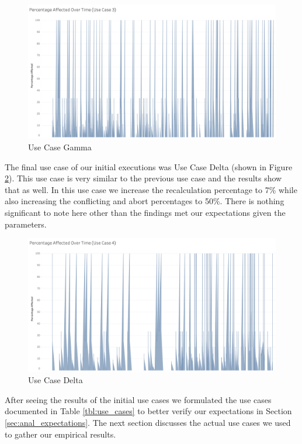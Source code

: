\begin{figure}
\centering
\includegraphics[scale=0.35]{images/UseCase3.png}
\caption{Use Case Gamma}
\label{image:use_case_gamma}
\end{figure}

The final use case of our initial executions was Use Case Delta (shown in Figure \ref{image:use_case_delta}). This use case is very similar to the previous use case and the results show that as well. In this use case we increase the recalculation percentage to 7\% while also increasing the conflicting and abort percentages to 50\%. There is nothing significant to note here other than the findings met our expectations given the parameters.

\begin{figure}
\centering
\includegraphics[scale=0.35]{images/UseCase4.png}
\caption{Use Case Delta}
\label{image:use_case_delta}
\end{figure}

After seeing the results of the initial use cases we formulated the use cases documented in Table \ref{tbl:use_cases} to better verify our expectations in Section \ref{sec:anal_expectations}. The next section discusses the actual use cases we used to gather our empirical results.